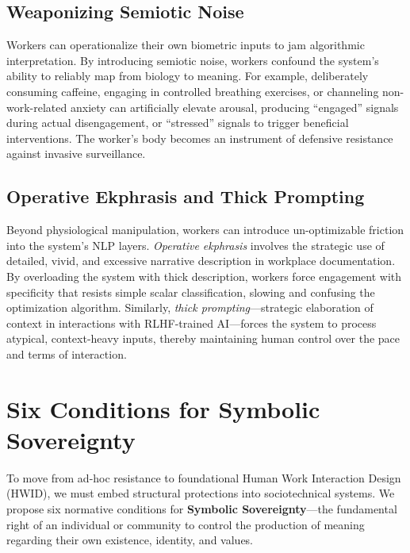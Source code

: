 \documentclass[11pt, a4paper]{article}
\begin{document}
\subsection{Weaponizing Semiotic Noise}
Workers can operationalize their own biometric inputs to jam algorithmic interpretation. By introducing semiotic noise, workers confound the system's ability to reliably map from biology to meaning. For example, deliberately consuming caffeine, engaging in controlled breathing exercises, or channeling non-work-related anxiety can artificially elevate arousal, producing ``engaged'' signals during actual disengagement, or ``stressed'' signals to trigger beneficial interventions. The worker's body becomes an instrument of defensive resistance against invasive surveillance.

\subsection{Operative Ekphrasis and Thick Prompting}
Beyond physiological manipulation, workers can introduce un-optimizable friction into the system's NLP layers. \textit{Operative ekphrasis} involves the strategic use of detailed, vivid, and excessive narrative description in workplace documentation. By overloading the system with thick description, workers force engagement with specificity that resists simple scalar classification, slowing and confusing the optimization algorithm. Similarly, \textit{thick prompting}---strategic elaboration of context in interactions with RLHF-trained AI---forces the system to process atypical, context-heavy inputs, thereby maintaining human control over the pace and terms of interaction.

\section{Six Conditions for Symbolic Sovereignty}

To move from ad-hoc resistance to foundational Human Work Interaction Design (HWID), we must embed structural protections into sociotechnical systems. We propose six normative conditions for \textbf{Symbolic Sovereignty}---the fundamental right of an individual or community to control the production of meaning regarding their own existence, identity, and values.
\end{document}
